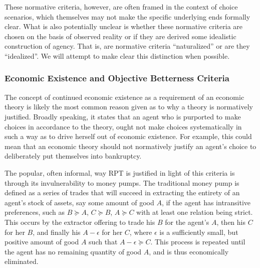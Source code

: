 \documentclass[11pt,a4paper]{article}
\begin{document}
These normative criteria, however, are often framed in the context of choice scenarios, which themselves may not make the specific underlying ends formally clear.
What is also potentially unclear is whether these normative criteria are chosen on the basis of observed reality or if they are derived some idealistic construction of agency.
That is, are normative criteria \enquote{naturalized} or are they \enquote{idealized}.
We will attempt to make clear this distinction when possible.

\subsubsection{Economic Existence and Objective Betterness Criteria}

The concept of continued economic existence as a requirement of an economic theory is likely the most common reason given as to why a theory is normatively justified.
Broadly speaking, it states that an agent who is purported to make choices in accordance to the theory, ought not make choices systematically in such a way as to drive herself out of economic existence.
For example, this could mean that an economic theory should not normatively justify an agent's choice to deliberately put themselves into bankruptcy.{\footnotemark}

\addtocounter{footnote}{-1}

The popular, often informal, way RPT is justified in light of this criteria is through its invulnerability to money pumps.
The traditional money pump is defined as a series of trades that will succeed in extracting the entirety of an agent's stock of assets, say some amount of good $A$, if the agent has intransitive preferences, such as $B \succcurlyeq A$, $C \succcurlyeq B$, $A \succcurlyeq C$ with at least one relation being strict.
This occurs by the extractor offering to trade his $B$ for the agent's $A$, then his $C$ for her $B$, and finally his $A - \epsilon$ for her $C$, where $\epsilon$ is a sufficiently small, but positive amount of good $A$ such that $A - \epsilon \succcurlyeq C$.
This process is repeated until the agent has no remaining quantity of good $A$, and is thus economically eliminated.
\end{document}
